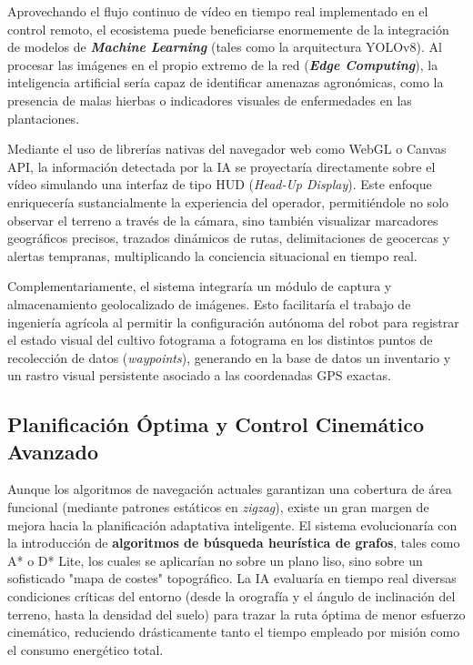 Aprovechando el flujo continuo de vídeo en tiempo real implementado en el control remoto, el ecosistema puede beneficiarse enormemente de la integración de modelos de \textbf{\textit{Machine Learning}} (tales como la arquitectura YOLOv8). Al procesar las imágenes en el propio extremo de la red (\textbf{\textit{Edge Computing}}), la inteligencia artificial sería capaz de identificar amenazas agronómicas, como la presencia de malas hierbas o indicadores visuales de enfermedades en las plantaciones.

Mediante el uso de librerías nativas del navegador web como WebGL o Canvas API, la información detectada por la IA se proyectaría directamente sobre el vídeo simulando una interfaz de tipo HUD (\textit{Head-Up Display}). Este enfoque enriquecería sustancialmente la experiencia del operador, permitiéndole no solo observar el terreno a través de la cámara, sino también visualizar marcadores geográficos precisos, trazados dinámicos de rutas, delimitaciones de geocercas y alertas tempranas, multiplicando la conciencia situacional en tiempo real.

Complementariamente, el sistema integraría un módulo de captura y almacenamiento geolocalizado de imágenes. Esto facilitaría el trabajo de ingeniería agrícola al permitir la configuración autónoma del robot para registrar el estado visual del cultivo fotograma a fotograma en los distintos puntos de recolección de datos (\textit{waypoints}), generando en la base de datos un inventario y un rastro visual persistente asociado a las coordenadas GPS exactas.

\subsection{Planificación Óptima y Control Cinemático Avanzado}

Aunque los algoritmos de navegación actuales garantizan una cobertura de área funcional (mediante patrones estáticos en \textit{zigzag}), existe un gran margen de mejora hacia la planificación adaptativa inteligente. El sistema evolucionaría con la introducción de \textbf{algoritmos de búsqueda heurística de grafos}, tales como A* o D* Lite, los cuales se aplicarían no sobre un plano liso, sino sobre un sofisticado "mapa de costes" topográfico. La IA evaluaría en tiempo real diversas condiciones críticas del entorno (desde la orografía y el ángulo de inclinación del terreno, hasta la densidad del suelo) para trazar la ruta óptima de menor esfuerzo cinemático, reduciendo drásticamente tanto el tiempo empleado por misión como el consumo energético total.

